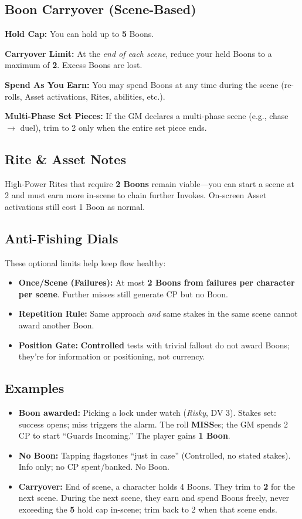 \subsection{Boon Carryover (Scene-Based)}
\textbf{Hold Cap:} You can hold up to \textbf{5} Boons.

\textbf{Carryover Limit:} At the \emph{end of each scene}, reduce your held Boons to a maximum of \textbf{2}. Excess Boons are lost.

\textbf{Spend As You Earn:} You may spend Boons at any time during the scene (re-rolls, Asset activations, Rites, abilities, etc.).

\textbf{Multi-Phase Set Pieces:} If the GM declares a multi-phase scene (e.g., chase $\rightarrow$ duel), trim to 2 only when the entire set piece ends.

\subsection{Rite \& Asset Notes}
High-Power Rites that require \textbf{2 Boons} remain viable—you can start a scene at 2 and must earn more in-scene to chain further Invokes. On-screen Asset activations still cost 1 Boon as normal.

\subsection{Anti-Fishing Dials}
These optional limits help keep flow healthy:
\begin{itemize}
  \item \textbf{Once/Scene (Failures):} At most \textbf{2 Boons from failures per character per scene}. Further misses still generate CP but no Boon.
  \item \textbf{Repetition Rule:} Same approach \emph{and} same stakes in the same scene cannot award another Boon.
  \item \textbf{Position Gate:} \textbf{Controlled} tests with trivial fallout do not award Boons; they're for information or positioning, not currency.
\end{itemize}

\subsection{Examples}
\begin{itemize}
  \item \textbf{Boon awarded:} Picking a lock under watch (\emph{Risky}, DV 3). Stakes set: success opens; miss triggers the alarm. The roll \textbf{MISS}es; the GM spends 2 CP to start ``Guards Incoming.'' The player gains \textbf{1 Boon}.
  \item \textbf{No Boon:} Tapping flagstones ``just in case'' (Controlled, no stated stakes). Info only; no CP spent/banked. No Boon.
  \item \textbf{Carryover:} End of scene, a character holds 4 Boons. They trim to \textbf{2} for the next scene. During the next scene, they earn and spend Boons freely, never exceeding the \textbf{5} hold cap in-scene; trim back to 2 when that scene ends.
\end{itemize}


